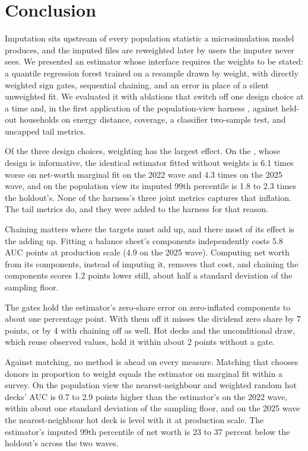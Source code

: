 \section{Conclusion}
\label{sec:conclusion}

Imputation sits upstream of every population statistic a microsimulation
model produces, and the imputed files are reweighted later by users the
imputer never sees. We presented an estimator whose interface requires the
weights to be stated: a quantile regression forest trained on a resample
drawn by weight, with directly weighted sign gates, sequential chaining, and
an error in place of a silent unweighted fit. We evaluated it with ablations
that switch off one design choice at a time and, in the first application of
the population-view harness \citep{ghenis2026popdgp}, against held-out
\scf{} households on energy distance, coverage, a classifier two-sample
test, and uncapped tail metrics.

Of the three design choices, weighting has the largest effect. On the
\scf{}, whose design is informative, the identical estimator fitted without
weights is 6.1 times worse on net-worth marginal fit on the 2022 wave and
4.3 times on the 2025 wave, and on the population view its imputed 99th
percentile is 1.8 to 2.3 times the holdout's. None of the harness's three
joint metrics captures that inflation. The tail metrics do, and they were
added to the harness for that reason.

Chaining matters where the targets must add up, and there most of its
effect is the adding up. Fitting a balance sheet's components independently
costs 5.8 AUC points at production scale (4.9 on the 2025 wave). Computing
net worth from its components, instead of imputing it, removes that cost,
and chaining the components scores 1.2 points lower still, about half a
standard deviation of the sampling floor.

The gates hold the estimator's zero-share error on zero-inflated components
to about one percentage point. With them off it misses the dividend zero
share by 7 points, or by 4 with chaining off as well. Hot decks and the
unconditional draw, which reuse observed values, hold it within about 2
points without a gate.

Against matching, no method is ahead on every measure. Matching that
chooses donors in proportion to weight equals the estimator on marginal fit
within a survey. On the population view the nearest-neighbour and weighted
random hot decks' AUC is 0.7 to 2.9 points higher than the estimator's on
the 2022 wave, within about one standard deviation of the sampling floor,
and on the 2025 wave the nearest-neighbour hot deck is level with it at
production scale. The estimator's imputed 99th percentile of net worth is 23
to 37 percent below the holdout's across the two waves.

